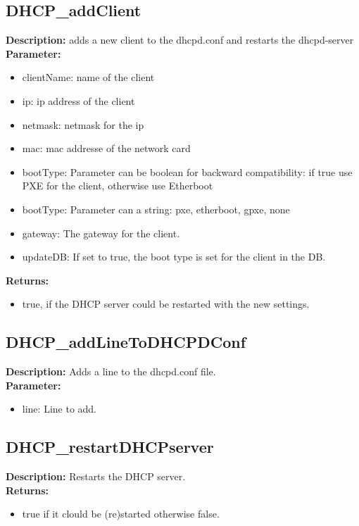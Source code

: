 \subsection{DHCP\_addClient}
\textbf{Description:} adds a new client to the dhcpd.conf and restarts the dhcpd-server\\
\textbf{Parameter:}
\begin{itemize}
\item clientName: name of the client
\item ip: ip address of the client
\item netmask: netmask for the ip
\item mac: mac addresse of the network card
\item bootType: Parameter can be boolean for backward compatibility: if true use PXE for the client, otherwise use Etherboot
\item bootType: Parameter can a string: pxe, etherboot, gpxe, none
\item gateway: The gateway for the client.
\item updateDB: If set to true, the boot type is set for the client in the DB.
\end{itemize}
\textbf{Returns:}
\begin{itemize}
\item true, if the DHCP server could be restarted with the new settings.
\end{itemize}

\subsection{DHCP\_addLineToDHCPDConf}
\textbf{Description:} Adds a line to the dhcpd.conf file.\\
\textbf{Parameter:}
\begin{itemize}
\item line: Line to add.
\end{itemize}

\subsection{DHCP\_restartDHCPserver}
\textbf{Description:} Restarts the DHCP server.\\
\textbf{Returns:}
\begin{itemize}
\item true if it clould be (re)started otherwise false.
\end{itemize}

